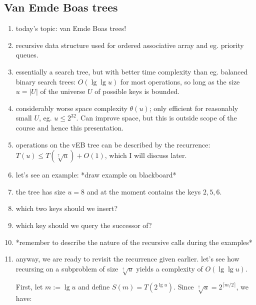 \newpage

\subsection{Van Emde Boas trees}

\begin{enumerate}
  \item today's topic: van Emde Boas trees!

  \item recursive data structure used for ordered associative array and eg.
    priority queues.

  \item essentially a search tree, but with better time complexity than eg.
    balanced binary search trees: $O(\lg \lg u)$ for most operations, so long
    as the size $u = |U|$ of the universe $U$ of possible keys is bounded.

  \item considerably worse space complexity $\theta(u)$; only efficient for
    reasonably small $U$, eg. $u \leq 2^{32}$. Can improve space, but this is
    outside scope of the course and hence this presentation.

  \item operations on the vEB tree can be described by the recurrence: $T(u)
    \leq T(\sqrt[\uparrow]{u}) + O(1)$, which I will discuss later.

  \item let's see an example: *draw example on blackboard*

  \item the tree has size $u = 8$ and at the moment contains the keys $2, 5, 6$.

  \item which two keys should we insert?

  \item which key should we query the successor of?

  \item *remember to describe the nature of the recursive calls during the
    examples*

  \item anyway, we are ready to revisit the recurrence given earlier. let's see
    how recursing on a subproblem of size $\sqrt[\uparrow]{u}$ yields a
    complexity of $O(\lg \lg u)$.

    First, let $m := \lg u$ and define $S(m) = T(2^{\lg u})$. Since
    $\sqrt[\uparrow]{u} = 2^{\lceil m / 2 \rceil}$, we have:


\end{enumerate}
